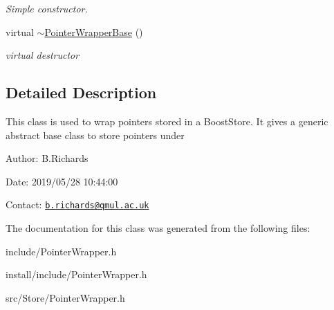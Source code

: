 \begin{DoxyCompactItemize}
\begin{DoxyCompactList}\small\item\em Simple constructor. \end{DoxyCompactList}\item 
\hypertarget{classPointerWrapperBase_a842fb0af38187d71678971452c1e1094}{virtual \hyperlink{classPointerWrapperBase_a842fb0af38187d71678971452c1e1094}{$\sim$\-Pointer\-Wrapper\-Base} ()}\label{classPointerWrapperBase_a842fb0af38187d71678971452c1e1094}

\begin{DoxyCompactList}\small\item\em virtual destructor \end{DoxyCompactList}\end{DoxyCompactItemize}


\subsection{Detailed Description}
This class is used to wrap pointers stored in a Boost\-Store. It gives a generic abstract base class to store pointers under

\begin{DoxyParagraph}{Author\-:}
B.\-Richards 
\end{DoxyParagraph}
\begin{DoxyParagraph}{Date\-:}
2019/05/28 10\-:44\-:00 
\end{DoxyParagraph}
Contact\-: \href{mailto:b.richards@qmul.ac.uk}{\tt b.\-richards@qmul.\-ac.\-uk} 

The documentation for this class was generated from the following files\-:\begin{DoxyCompactItemize}
\item 
include/Pointer\-Wrapper.\-h\item 
install/include/Pointer\-Wrapper.\-h\item 
src/\-Store/Pointer\-Wrapper.\-h\end{DoxyCompactItemize}
